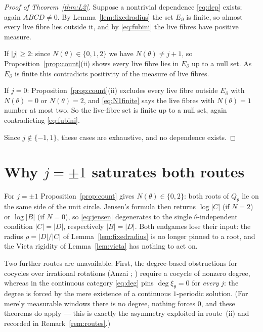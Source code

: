 \documentclass[11pt]{amsart}
\theoremstyle{remark}
\DeclareMathOperator{\dg}{deg}
\begin{document}
\begin{proof}[Proof of Theorem~\ref{thm:L2}]
Suppose a nontrivial dependence \eqref{eq:dep} exists; again $ABCD\neq0$. By
Lemma~\ref{lem:fixedradius} the set $E_\partial$ is finite, so almost every live fibre lies
outside it, and by \eqref{eq:fubini} the live fibres have positive measure.

If $|j|\geq2$: since $N(\theta)\in\{0,1,2\}$ we have $N(\theta)\neq j+1$, so
Proposition~\ref{prop:count}(ii) shows every live fibre lies in $E_\partial$ up to a null set.
As $E_\partial$ is finite this contradicts positivity of the measure of live fibres.

If $j=0$: Proposition~\ref{prop:count}(ii) excludes every live fibre outside $E_\partial$ with
$N(\theta)=0$ or $N(\theta)=2$, and \eqref{eq:N1finite} says the live fibres with
$N(\theta)=1$ number at most two. So the live-fibre set is finite up to a null set, again
contradicting \eqref{eq:fubini}.

Since $j\notin\{-1,1\}$, these cases are exhaustive, and no dependence exists.
\end{proof}

\section{Why $j=\pm1$ saturates both routes}\label{sec:saturate}

For $j=\pm1$ Proposition~\ref{prop:count} gives $N(\theta)\in\{0,2\}$: both roots of $Q_\theta$
lie on the same side of the unit circle. Jensen's formula then returns $\log|C|$ (if $N=2$) or
$\log|B|$ (if $N=0$), so \eqref{eq:jensen} degenerates to the single $\theta$-independent
condition $|C|=|D|$, respectively $|B|=|D|$. Both endgames lose their input: the radius
$\rho=|D|/|C|$ of Lemma~\ref{lem:fixedradius} is no longer pinned to a root, and the Vieta
rigidity of Lemma~\ref{lem:vieta} has nothing to act on.

Two further routes are unavailable. First, the degree-based obstructions for cocycles over
irrational rotations (Anzai \cite{Anz}; \cite{ILR}) require a cocycle of nonzero degree,
whereas in the continuous category \eqref{eq:deg} pins $\dg\xi_\theta=0$ for \emph{every} $j$:
the degree is forced by the mere existence of a continuous $1$-periodic solution. (For merely
measurable windows there is no degree, nothing forces $0$, and these theorems do apply --- this
is exactly the asymmetry exploited in route~(ii) and recorded in Remark~\ref{rem:routes}.)
\end{document}
